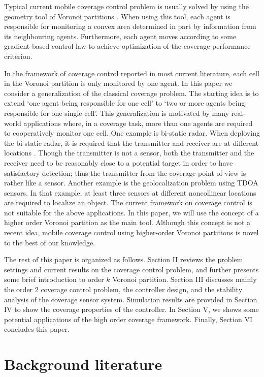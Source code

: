 \documentclass[letterpaper, 10 pt, conference]{ieeeconf}
\begin{document}
Typical current mobile coverage control problem is usually solved by using the geometry tool of  Voronoi partitions \cite{de2000computational}. When using this tool, each agent is responsible for monitoring a convex area determined in part by information from its neighbouring agents. Furthermore, each agent moves according to some gradient-based control law to achieve optimization of the coverage performance criterion.

In the framework of coverage control reported in most current literature, each cell in the Voronoi partition is only monitored by one agent.
In this paper we consider a generalization of the classical coverage problem. The starting
idea is to extend `one agent being responsible for one cell' to `two or more agents being responsible for one single cell'. This generalization is motivated by
many real-world applications where, in a coverage task, more than one agents are required to cooperatively monitor one cell. One example is bi-static radar. When deploying the bi-static radar, it is required that the transmitter and receiver are at different locations \cite{4201772}. Though the transmitter is not a sensor, both the transmitter and the receiver need to be reasonably close to a potential target in order to have satisfactory detection; thus the transmitter from the coverage point of view is rather like a sensor.
Another example is the geolocalization problem using TDOA sensors. In that example, at least three sensors at different noncollinear locations are required to localize an object.
The current framework on coverage control is not suitable for the above applications. In this paper, we will use the concept of a higher order Voronoi partition as the main tool. Although this concept is not a recent idea, mobile coverage control using  higher-order Voronoi partitions is novel to the best of our knowledge.

The rest of this paper is organized as follows. Section II reviews the problem settings and current results on the coverage control problem, and further presents some brief introduction to order $k$  Voronoi partition. Section III discusses mainly the order 2 coverage control problem, the controller design,  and the stability analysis of the coverage sensor system. Simulation results are provided in Section IV to show the coverage properties of the controller. In Section V, we shows some potential applications of the high order coverage framework.  Finally, Section VI concludes this paper.

\section{Background literature}
\end{document}
